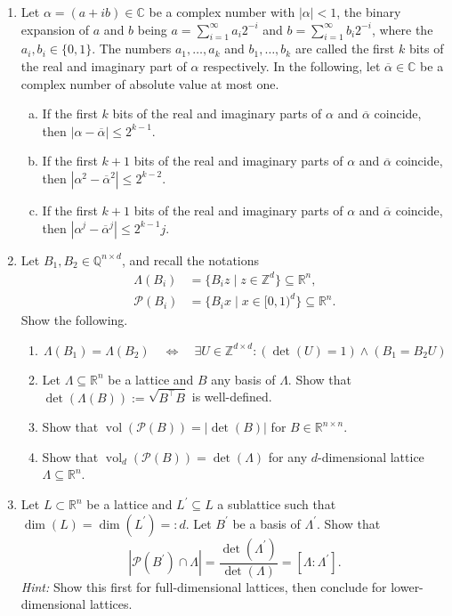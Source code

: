 \documentclass[12pt,a4paper]{article}
\newcommand{\br}[1]{\overline{#1}}
\def \R {\mathbb R}
\def \Q {\mathbb Q}
\def \Z {\mathbb Z}
\DeclareMathOperator{\vol}{vol}
\begin{document}
\begin{enumerate}
\item Let $α = (a + ib)∈ℂ$ be a complex number with $|α|<1$, the binary expansion of $a$ and $b$ being $a = ∑_{i=1}^∞ a_i 2^{-i}$ and  $b = ∑_{i=1}^∞ b_i 2^{-i}$, where the $a_i, b_i ∈ \{0,1\}$. The numbers $a_1,\dots,a_k$ and $b_1,\dots,b_k$ are called the first $k$ bits of the real and imaginary part of $α$ respectively. In the following, let $\br{α} ∈ℂ$ be a complex number of absolute value at most one. 
  \begin{enumerate}[a)]
  \item If the first $k$ bits of the real and imaginary parts of $α$ and $\br{α}$ coincide, then $|α - \br{α}| ≤2^{k-1}$.
  \item If the first $k+1$ bits of the real and imaginary parts of $α$ and $\br{α}$ coincide, then $|α^2 - \br{α}^2| ≤2^{k-2}$.
  \item If the first $k+1$ bits of the real and imaginary parts of $α$ and $\br{α}$ coincide, then $|α^j - \br{α}^j| ≤2^{k-1} j$.
  \end{enumerate}

\item Let $B_1, B_2 \in \Q^{n \times d}$, and recall the notations
\begin{align*}
\Lambda(B_i) &= \{ B_i z \mid z \in \Z^d\} \subseteq \R^n, \\
\mathcal{P}(B_i) &= \{B_i x \mid x \in [0,1)^d\} \subseteq \R^n.
\end{align*}
Show the following.
\begin{enumerate}
\item
\[
\Lambda (B_1) = \Lambda (B_2) \quad \Leftrightarrow \quad \exists U \in \Z^{d \times d}: (\det(U) = 1) \wedge (B_1 = B_2 U)
\]
\item Let $\Lambda \subseteq \R^n$ be a lattice and $B$ any basis of $\Lambda$.
Show that $\det (\Lambda(B)) := \sqrt{B^\intercal B}$ is well-defined.
\item Show that $\vol(\mathcal{P}(B)) = | \det (B) |$ for $B \in \R^{n \times n}$.
\item Show that $\vol_d(\mathcal{P}(B)) = \det (\Lambda)$ for any $d$-dimensional lattice $\Lambda \subseteq \R^n$.
\end{enumerate}
\item Let $L \subset \R^n$ be a lattice and $L^\prime \subseteq L$ a sublattice such that $\dim(L) = \dim(L^\prime) =: d$.
Let $B^\prime$ be a basis of $\Lambda^\prime$.
Show that
\[
 | \mathcal{P}(B^\prime) \cap \Lambda | = \frac{\det(\Lambda^\prime)}{\det (\Lambda)} = [\Lambda : \Lambda^\prime].
\]
\textit{Hint:} Show this first for full-dimensional lattices, then conclude for lower-dimensional lattices.
\end{enumerate}
\end{document}
